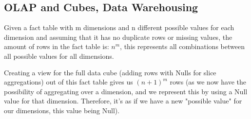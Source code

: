 \subsection{OLAP and Cubes, Data Warehousing}



Given a fact table with m dimensions and n different possible values for each dimension and assuming that it has no duplicate rows or missing values, the amount of rows in the fact table is: $n^m$, this represents all combinations between all possible values for all dimensions.

Creating a view for the full data cube (adding rows with Nulls for slice aggregations) out of this fact table gives us $(n+1)^m$ rows (as we now have the possibility of aggregating over a dimension, and we represent this by using a Null value for that dimension. Therefore, it's as if we have a new "possible value" for our dimensions, this value being Null).